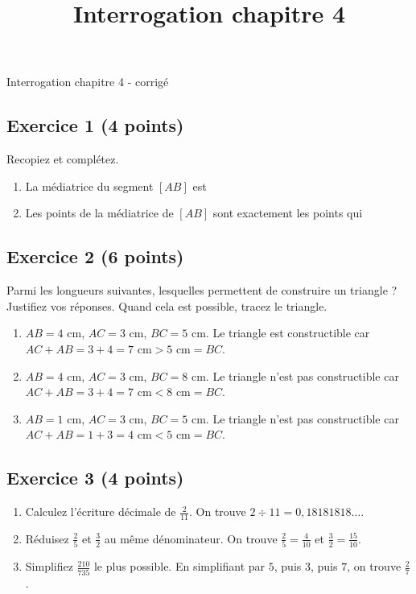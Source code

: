\documentclass[14 pt]{extarticle}
\title{Interrogation chapitre 4}
\date{}
\theoremstyle{plain}
\begin{document}
\begin{center}{\Large Interrogation chapitre 4 - corrigé}\\ 
 \end{center}
 
 
 \subsection*{Exercice 1 (4 points)}
 Recopiez et complétez. 
 \begin{enumerate}
 \item La médiatrice du segment $[AB]$ est {\color{red}{la droite qui coupe le segment en son milieu perpendiculairement.}}
 \item Les points de la médiatrice de $[AB]$ sont exactement les points qui {\color{red}{sont à la même distance de $A$ et de $B$.}}
 \end{enumerate}
 
 \subsection*{Exercice 2 (6 points)}
 
Parmi les longueurs suivantes, lesquelles permettent de construire un triangle ? Justifiez vos réponses. Quand cela est possible, tracez le triangle.
\begin{enumerate}
\item $AB = 4$ cm, $AC = 3$ cm, $BC = 5$ cm.
{\color{red}Le triangle est constructible car $AC + AB = 3 + 4 = 7 \text{ cm} > 5 \text{ cm} = BC$.}


\item $AB = 4$ cm, $AC = 3$ cm, $BC = 8$ cm. {\color{red}Le triangle n'est pas constructible car $AC + AB = 3 + 4 = 7 \text{ cm} < 8 \text{ cm} = BC$.}
\item $AB = 1$ cm, $AC = 3$ cm, $BC = 5$ cm. {\color{red}Le triangle n'est pas constructible car $AC + AB = 1 + 3 = 4 \text{ cm} < 5 \text{ cm} = BC$.}
\end{enumerate}


\subsection*{Exercice 3 (4 points)}
\begin{enumerate}
\item Calculez l'écriture décimale de $\frac2{11}$. {\color{red} On trouve $2\div 11 = 0,18181818\ldots$}.
\item Réduisez $\frac25$ et $\frac32$ au même dénominateur. 
{\color{red} On trouve $\frac25 = \frac4{10}$ et $\frac32 = \frac{15}{10}$.}
\item Simplifiez $\frac{210}{735}$ le plus possible. 
{\color{red} En simplifiant par $5$, puis $3$, puis $7$, on trouve $\frac{2}{7}$.}
\end{enumerate}
\end{document}
